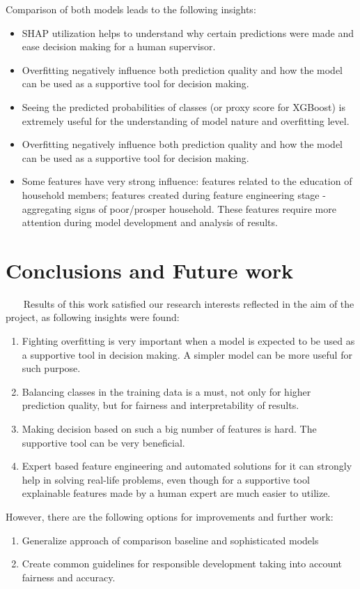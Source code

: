         Comparison of both models leads to the following insights:
        \begin{itemize}
            \item SHAP utilization helps to understand why certain predictions were made and ease decision making for a human supervisor.
            \item Overfitting negatively influence both prediction quality and how the model can be used as a supportive tool for decision making.
            \item Seeing the predicted probabilities of classes (or proxy score for XGBoost) is extremely useful for the understanding of model nature and overfitting level.
            \item Overfitting negatively influence both prediction quality and how the model can be used as a supportive tool for decision making.
            \item Some features have very strong influence: features related to the education of household members; features created during feature engineering stage - aggregating signs of poor/prosper household. These features require more attention during model development and analysis of results.
        \end{itemize}
        
\section{Conclusions and Future work}~~~
    Results of this work satisfied our research interests reflected in the aim of the project, as following insights were found:
    \begin{enumerate}
        \item Fighting overfitting is very important when a model is expected to be used as a supportive tool in decision making. A simpler model can be more useful for such purpose.
        \item Balancing classes in the training data is a must, not only for higher prediction quality, but for fairness and interpretability of results.
        \item Making decision based on such a big number of features is hard. The supportive tool can be very beneficial. 
        \item Expert based feature engineering and automated solutions for it can strongly help in solving real-life problems, even though for a supportive tool explainable features made by a human expert are much easier to utilize.
    \end{enumerate}
    
    However, there are the following options for improvements and further work:
    \begin{enumerate}
        \item Generalize approach of comparison baseline and sophisticated models
        \item Create common guidelines for responsible development taking into account fairness and accuracy.
    \end{enumerate}





